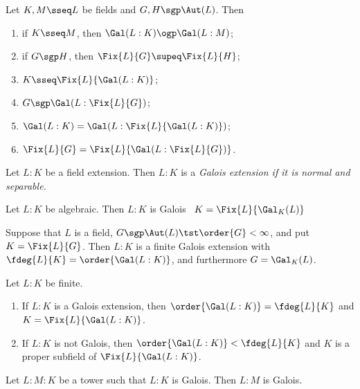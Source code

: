 \documentclass{article}
\begin{document}
\begin{ttheorem}
  Let \( K,M \sseq L \) be fields and \( G, H \sgp \Aut(L) \).
  Then \begin{enumerate}[label=\arabic*)]
    \item if \( K\sseq M \), then \( \Gal(L:K) \ogp \Gal(L:M) \);
    \item if \( G\sgp H \), then \( \Fix{L}{G} \supeq \Fix{L}{H} \);
    \item \( K\sseq \Fix{L}{\Gal(L:K)} \);
    \item \( G\sgp\Gal(L:\Fix{L}{G}) \);
    \item \( \Gal(L:K) = \Gal(L:\Fix{L}{\Gal(L:K)}) \);
    \item \( \Fix{L}{G} = \Fix{L}{\Gal(L:\Fix{L}{G})} \).
  \end{enumerate}
\end{ttheorem}

\begin{tdefinition}
  Let \( L:K \) be a field extension.
  Then \( L:K \) is a \it{Galois extension} if it is normal and separable.
\end{tdefinition}

\begin{ttheorem}
  Let \( L:K \) be algebraic.
  Then \( L:K \) is Galois \iff~\( K=\Fix{L}{\Gal_K(L)} \)
\end{ttheorem}

\begin{ttheorem}
  Suppose that \( L \) is a field, \( G\sgp \Aut(L) \tst \order{G}<\infty\), and put \( K=\Fix{L}{G} \).
  Then \( L:K \) is a finite Galois extension with \( \fdeg{L}{K}=\order{\Gal(L:K)} \), and furthermore \( G=\Gal_K(L) \).
\end{ttheorem}

\begin{ttheorem}
  Let \( L:K \) be finite.
  \begin{enumerate}
    \item If \( L:K \) is a Galois extension, then \( \order{\Gal(L:K)}=\fdeg{L}{K} \) and \( K=\Fix{L}{\Gal(L:K)} \).
    \item If \( L:K \) is not Galois, then \( \order{\Gal(L:K)}<\fdeg{L}{K} \) and \( K \) is a proper subfield of \( \Fix{L}{\Gal(L:K)} \).
  \end{enumerate}
\end{ttheorem}

\begin{tcorollary}
  Let \( L:M:K \) be a tower such that \( L:K \) is Galois.
  Then \( L:M \) is Galois.
\end{tcorollary}
\end{document}

